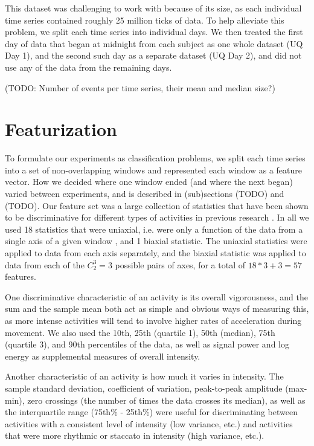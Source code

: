 This dataset was challenging to work with because of its size, as each individual time series
contained roughly 25 million ticks of data. To help alleviate this problem, we split each
time series into individual days. We then treated the first day of data that began at midnight
from each subject as one whole dataset (UQ Day 1), and the second such day as a separate dataset
(UQ Day 2), and did not use any of the data from the remaining days.

(TODO: Number of events per time series, their mean and median size?)

\section{Featurization}
To formulate our experiments as classification problems, we split each time series into a set of
non-overlapping windows and represented each window as a feature vector.
How we decided where one window ended (and where the next began) varied between
experiments, and is described in (sub)sections (TODO) and (TODO). Our feature
set was a large collection of statistics that have been shown to be discriminative
for different types of activities in previous research \cite{li09} \cite{rothney07}
\cite{staudenmeyer09} \cite{zheng12}. In all we used 18 statistics that were
uniaxial, i.e. were only a function of the data from a single axis of a given window
, and 1 biaxial statistic.
The uniaxial statistics were applied to data from each axis separately, and
the biaxial statistic was applied to data from each of the $C_2^3=3$ possible pairs of
axes, for a total of $18*3+3 = 57$ features.

One discriminative characteristic of an activity is its overall vigorousness,
and the sum and the sample mean both act as simple and obvious ways of measuring this,
as more intense activities will tend to involve
higher rates of acceleration during movement. We also used the 10th, 25th (quartile 1),
50th (median), 75th (quartile 3), and 90th percentiles of the data, as well as signal
power and log energy as supplemental measures of overall intensity.

Another characteristic of an activity is how much it varies in intensity. The sample standard
deviation, coefficient of variation, peak-to-peak amplitude (max-min), zero crossings
(the number of times the data crosses its median), as well as the
interquartile range (75th\% - 25th\%) were useful for discriminating between activities
with a consistent level of intensity (low variance, etc.) and activities that were more
rhythmic or staccato in intensity (high variance, etc.). 

